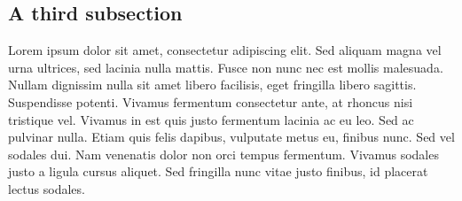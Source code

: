 \documentclass[letterpaper,11pt,leqno]{article}
\begin{document}
\subsection{A third subsection}

Lorem ipsum dolor sit amet, consectetur adipiscing elit. Sed aliquam magna vel urna ultrices, sed lacinia nulla mattis. Fusce non nunc nec est mollis malesuada. Nullam dignissim nulla sit amet libero facilisis, eget fringilla libero sagittis. Suspendisse potenti. Vivamus fermentum consectetur ante, at rhoncus nisi tristique vel. Vivamus in est quis justo fermentum lacinia ac eu leo. Sed ac pulvinar nulla. Etiam quis felis dapibus, vulputate metus eu, finibus nunc. Sed vel sodales dui. Nam venenatis dolor non orci tempus fermentum. Vivamus sodales justo a ligula cursus aliquet. Sed fringilla nunc vitae justo finibus, id placerat lectus sodales.
\end{document}
